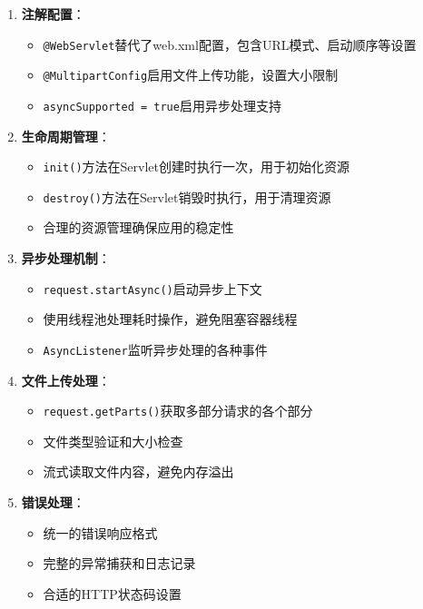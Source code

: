 \begin{enumerate}
\def\labelenumi{\arabic{enumi}.}
\tightlist
\item
  \textbf{注解配置}：

  \begin{itemize}
  \tightlist
  \item
    \texttt{@WebServlet}替代了web.xml配置，包含URL模式、启动顺序等设置
  \item
    \texttt{@MultipartConfig}启用文件上传功能，设置大小限制
  \item
    \texttt{asyncSupported = true}启用异步处理支持
  \end{itemize}
\item
  \textbf{生命周期管理}：

  \begin{itemize}
  \tightlist
  \item
    \texttt{init()}方法在Servlet创建时执行一次，用于初始化资源
  \item
    \texttt{destroy()}方法在Servlet销毁时执行，用于清理资源
  \item
    合理的资源管理确保应用的稳定性
  \end{itemize}
\item
  \textbf{异步处理机制}：

  \begin{itemize}
  \tightlist
  \item
    \texttt{request.startAsync()}启动异步上下文
  \item
    使用线程池处理耗时操作，避免阻塞容器线程
  \item
    \texttt{AsyncListener}监听异步处理的各种事件
  \end{itemize}
\item
  \textbf{文件上传处理}：

  \begin{itemize}
  \tightlist
  \item
    \texttt{request.getParts()}获取多部分请求的各个部分
  \item
    文件类型验证和大小检查
  \item
    流式读取文件内容，避免内存溢出
  \end{itemize}
\item
  \textbf{错误处理}：

  \begin{itemize}
  \tightlist
  \item
    统一的错误响应格式
  \item
    完整的异常捕获和日志记录
  \item
    合适的HTTP状态码设置
  \end{itemize}
\end{enumerate}

